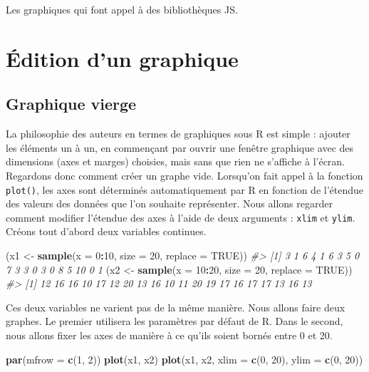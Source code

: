\documentclass[]{article}
\newenvironment{Shaded}{\begin{snugshade}}{\end{snugshade}}
\newcommand{\CommentTok}[1]{\textcolor[rgb]{0.56,0.35,0.01}{\textit{#1}}}
\newcommand{\DataTypeTok}[1]{\textcolor[rgb]{0.13,0.29,0.53}{#1}}
\newcommand{\DecValTok}[1]{\textcolor[rgb]{0.00,0.00,0.81}{#1}}
\newcommand{\KeywordTok}[1]{\textcolor[rgb]{0.13,0.29,0.53}{\textbf{#1}}}
\newcommand{\NormalTok}[1]{#1}
\newcommand{\OperatorTok}[1]{\textcolor[rgb]{0.81,0.36,0.00}{\textbf{#1}}}
\newcommand{\OtherTok}[1]{\textcolor[rgb]{0.56,0.35,0.01}{#1}}
\newcommand{\StringTok}[1]{\textcolor[rgb]{0.31,0.60,0.02}{#1}}
\begin{document}
Les graphiques qui font appel à des bibliothèques JS.

\hypertarget{uxe9dition-dun-graphique}{%
\section{Édition d'un graphique}\label{uxe9dition-dun-graphique}}

\hypertarget{graphique-vierge}{%
\subsection{Graphique vierge}\label{graphique-vierge}}

La philosophie des auteurs en termes de graphiques sous R est simple : ajouter les éléments un à un, en commençant par ouvrir une fenêtre graphique avec des dimensions (axes et marges) choisies, mais sans que rien ne s'affiche à l'écran. Regardons donc comment créer un graphe vide.
Lorsqu'on fait appel à la fonction \texttt{plot()}, les axes sont déterminés automatiquement par R en fonction de l'étendue des valeurs des données que l'on souhaite représenter. Nous allons regarder comment modifier l'étendue des axes à l'aide de deux arguments : \texttt{xlim} et \texttt{ylim}.
Créons tout d'abord deux variables continues.

\begin{Shaded}
\begin{Highlighting}[]
\NormalTok{(x1 <-}\StringTok{ }\KeywordTok{sample}\NormalTok{(}\DataTypeTok{x =} \DecValTok{0}\OperatorTok{:}\DecValTok{10}\NormalTok{, }\DataTypeTok{size =} \DecValTok{20}\NormalTok{, }\DataTypeTok{replace =} \OtherTok{TRUE}\NormalTok{))}
\CommentTok{#>  [1]  3  1  6  4  1  6  3  5  0  7  3  3  0  3  0  8  5 10  0  1}
\NormalTok{(x2 <-}\StringTok{ }\KeywordTok{sample}\NormalTok{(}\DataTypeTok{x =} \DecValTok{10}\OperatorTok{:}\DecValTok{20}\NormalTok{, }\DataTypeTok{size =} \DecValTok{20}\NormalTok{, }\DataTypeTok{replace =} \OtherTok{TRUE}\NormalTok{))}
\CommentTok{#>  [1] 12 16 16 10 17 12 20 13 16 10 11 20 19 17 16 17 17 13 16 13}
\end{Highlighting}
\end{Shaded}

Ces deux variables ne varient pas de la même manière. Nous allons faire deux graphes. Le premier utilisera les paramètres par défaut de R. Dans le second, nous allons fixer les axes de manière à ce qu'ils soient bornés entre 0 et 20.

\begin{Shaded}
\begin{Highlighting}[]
\KeywordTok{par}\NormalTok{(}\DataTypeTok{mfrow =} \KeywordTok{c}\NormalTok{(}\DecValTok{1}\NormalTok{, }\DecValTok{2}\NormalTok{))}
\KeywordTok{plot}\NormalTok{(x1, x2)}
\KeywordTok{plot}\NormalTok{(x1, x2, }\DataTypeTok{xlim =} \KeywordTok{c}\NormalTok{(}\DecValTok{0}\NormalTok{, }\DecValTok{20}\NormalTok{), }\DataTypeTok{ylim =} \KeywordTok{c}\NormalTok{(}\DecValTok{0}\NormalTok{, }\DecValTok{20}\NormalTok{))}
\end{Highlighting}
\end{Shaded}
\end{document}
